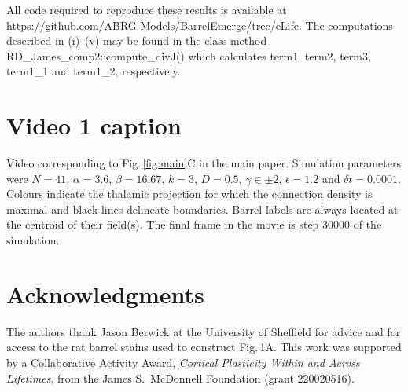 \documentclass[9pt,lineno]{elife}
\newcommand{\cmnt}[1]{\textcolor{colcmnt}{#1}}
\newcommand{\code}[1]{\textsf{#1}}
\begin{document}
All code required to reproduce these results is available at
\url{https://github.com/ABRG-Models/BarrelEmerge/tree/eLife}. The computations
described in (i)--(v) may be found in the class method
\code{RD\_James\cmnt{\_comp2}::compute\_divJ()} which calculates \code{term1},
\code{term2}, \code{term3}, \code{term1\_1} and \code{term1\_2}, respectively.

\section{Video 1 caption}

Video corresponding to Fig.\,\ref{fig:main}C in the main paper. Simulation parameters were
\cmnt{$N=41$, $\alpha=3.6$, $\beta=16.67$, $k=3$, $D=0.5$, $\gamma\in\pm 2$,
$\epsilon=1.2$ and $\delta{t}=0.0001$}. Colours indicate the thalamic
projection for which the connection density is maximal and black lines delineate
boundaries. \cmnt{Barrel labels are
  always located at the centroid of their field(s).} The final frame in the movie
is step 30000 of the simulation.

\section{Acknowledgments}

The authors thank Jason Berwick at the University of Sheffield for advice and
for access to the rat barrel stains used to construct Fig.\,1A. This work was
supported by a Collaborative Activity Award, \emph{Cortical Plasticity Within
  and Across Lifetimes}, from the James S.~McDonnell Foundation (grant
220020516).
\end{document}
